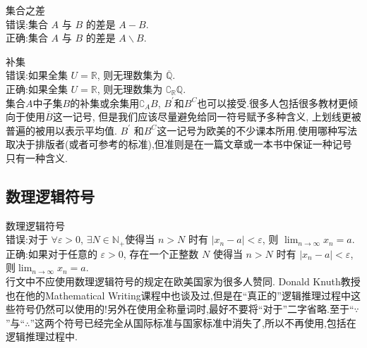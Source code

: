 \documentclass[a4paper]{article}
\begin{document}
\begin{compactitem}[\hspace{1.02em}$\bullet$]
	\item 集合之差\\
	\textsf{错误}:集合 $A$ 与 $B$ 的差是 $A-B$.\\
	\textsf{正确}:集合 $A$ 与 $B$ 的差是 $A \backslash B$.
	\item 补集\\
	\textsf{错误}:如果全集 $U=\mathbb{R}$, 则无理数集为 $\overline{\mathbb{Q}}$.\\
    \textsf{正确}:如果全集 $U=\mathbb{R}$, 则无理数集为 $\complement_{\mathbb{R}} \mathbb{Q}$.\\
	集合$A$中子集$B$的补集或余集用$\complement_{A} B$, $B^{\prime}$和$B^{C}$也可以接受.很多人包括很多教材更倾向于使用$\overline{B}$这一记号, 但是我们应该尽量避免给同一符号赋予多种含义, 上划线更被普遍的被用以表示平均值. $B^{\prime}$ 和$B^{C}$这一记号为欧美的不少课本所用.使用哪种写法取决于排版者(或者可参考的标准),但准则是在一篇文章或一本书中保证一种记号只有一种含义.\eop
\end{compactitem}

\subsection{数理逻辑符号}
\begin{compactitem}[\hspace{1.02em}$\bullet$]
	\item 数理逻辑符号\\
	\textsf{错误}:对于 $\forall \varepsilon>0$, $\exists N \in \mathbb{N}_{+}$使得当 $n>N$ 时有 $\left|x_{n}-a\right|<\varepsilon$, 则 $\lim _{n \rightarrow \infty} x_{n}=a$.\\
	\textsf{正确}:如果对于任意的 $\varepsilon>0$, 存在一个正整数 $N$ 使得当 $n>N$ 时有 $\left|x_{n}-a\right|<\varepsilon$, 则$\lim _{n \rightarrow \infty} x_{n}=a$.\\
	行文中不应使用数理逻辑符号的规定在欧美国家为很多人赞同. Donald Knuth教授也在他的Mathematical Writing课程中也谈及过,但是在``真正的''逻辑推理过程中这些符号仍然可以使用的!另外在使用全称量词时,最好不要将``对于''二字省略.至于``$\because$''与``$\therefore$''这两个符号已经完全从国际标准与国家标准中消失了,所以不再使用,包括在逻辑推理过程中.\eop
\end{compactitem}
\end{document}
